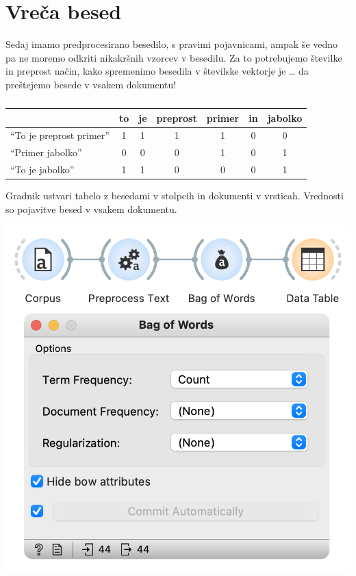 \chapter{Vreča besed}
\label{ch:vreca-besed}

Sedaj imamo predprocesirano besedilo, s pravimi pojavnicami, ampak še vedno pa ne moremo odkriti nikakršnih vzorcev v besedilu. Za to potrebujemo številke in preprost način, kako spremenimo besedila v številske vektorje je … da preštejemo besede v vsakem dokumentu!

\begin{table}
    \centering
    \begin{tabular}{ l c c c c c c }
        \hline
         &to&je&preprost&primer&in&jabolko\\
         \hline
        ``To je preprost primer'' & 1 & 1 & 1 & 1 & 0 & 0 \\ 
        ``Primer jabolko'' & 0 & 0 & 0 & 1 & 0 & 1 \\
        ``To je jabolko'' & 1 & 1 & 0 & 0 & 0 & 1\\
        \hline
    \end{tabular}
    \caption{ }
\end{table}

Gradnik  ustvari tabelo z besedami v stolpcih in dokumenti v vrsticah. Vrednosti so pojavitve besed v vsakem dokumentu.

\begin{marginfigure}[4cm]
    \includegraphics[width=\linewidth]{vreca-besed-workflow.png}
    \caption{}
\end{marginfigure}

